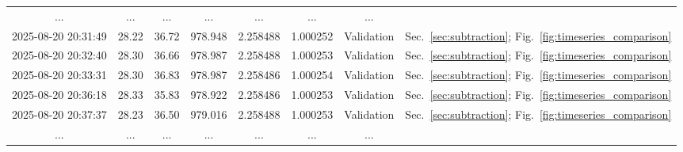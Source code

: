 \documentclass[aps,pra,reprint,groupedaddress,twocolumn,superscriptaddress]{revtex4-2}
\begin{document}
\begin{table}
\begin{ruledtabular}
\begin{tabular}{cccccccc}
... & ... & ... & ... & ... & ... & ... \\
2025-08-20 20:31:49 & 28.22 & 36.72 & 978.948 & 2.258488 & 1.000252 & Validation & Sec.~\ref{sec:subtraction}; Fig.~\ref{fig:timeseries_comparison} \\
2025-08-20 20:32:40 & 28.30 & 36.66 & 978.987 & 2.258488 & 1.000253 & Validation & Sec.~\ref{sec:subtraction}; Fig.~\ref{fig:timeseries_comparison} \\
2025-08-20 20:33:31 & 28.30 & 36.83 & 978.987 & 2.258486 & 1.000254 & Validation & Sec.~\ref{sec:subtraction}; Fig.~\ref{fig:timeseries_comparison} \\
2025-08-20 20:36:18 & 28.33 & 35.83 & 978.922 & 2.258486 & 1.000253 & Validation & Sec.~\ref{sec:subtraction}; Fig.~\ref{fig:timeseries_comparison} \\
2025-08-20 20:37:37 & 28.23 & 36.50 & 979.016 & 2.258488 & 1.000253 & Validation & Sec.~\ref{sec:subtraction}; Fig.~\ref{fig:timeseries_comparison} \\
... & ... & ... & ... & ... & ... & ... \\
\end{tabular}
\end{ruledtabular}
\label{tab:raw_data_sample}
\end{table}
\end{document}
